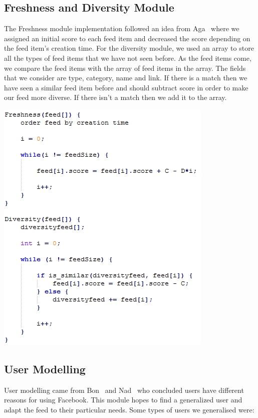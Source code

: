 \subsection{Freshness and Diversity Module}
The Freshness module implementation followed an idea from Aga~\cite{Aga2014} where we assigned an initial score to each feed item and decreased the score depending on the feed item’s creation time. For the diversity module, we used an array to store all the types of feed items that we have not seen before. As the feed items come, we compare the feed items with the array of feed items in the array. The fields that we consider are type, category, name and link. If there is a match then we have seen a similar feed item before and should subtract score in order to make our feed more diverse. If there isn’t a match then we add it to the array.

\begin{center}
\includegraphics[scale=0.8]{images/freshDiv.png}
\end{center}

\subsection{User Modelling}
User modelling came from Bon~\cite{bonds2010myspace} and Nad~\cite{nadkarni2012people} who concluded users have different reasons for using Facebook. This module hopes to find a generalized user and adapt the feed to their particular needs. Some types of users we generalised were:

